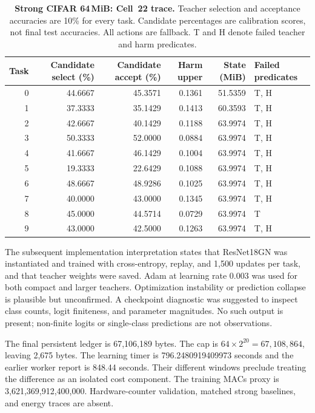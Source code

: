 \documentclass{article}
\begin{document}
\begin{table}[t]
\caption{\textbf{Strong CIFAR 64\,MiB: Cell~22 trace.} Teacher selection and acceptance accuracies are 10\% for every task. Candidate percentages are calibration scores, not final test accuracies. All actions are fallback. T and H denote failed teacher and harm predicates.}
\label{tab:strong-decisions}\centering\small
\begin{tabular}{rrrrrl}\toprule
Task & Candidate select (\%) & Candidate accept (\%) & Harm upper & State (MiB) & Failed predicates\\\midrule
0 & 44.6667 & 45.3571 & 0.1361 & 51.5359 & T, H\\
1 & 37.3333 & 35.1429 & 0.1413 & 60.3593 & T, H\\
2 & 42.6667 & 40.1429 & 0.1188 & 63.9974 & T, H\\
3 & 50.3333 & 52.0000 & 0.0884 & 63.9974 & T, H\\
4 & 41.6667 & 46.1429 & 0.1004 & 63.9974 & T, H\\
5 & 19.3333 & 22.6429 & 0.1088 & 63.9974 & T, H\\
6 & 48.6667 & 48.9286 & 0.1025 & 63.9974 & T, H\\
7 & 40.0000 & 43.0000 & 0.1345 & 63.9974 & T, H\\
8 & 45.0000 & 44.5714 & 0.0729 & 63.9974 & T\\
9 & 43.0000 & 42.5000 & 0.1263 & 63.9974 & T, H\\
\bottomrule\end{tabular}\end{table}

The subsequent implementation interpretation states that ResNet18GN was instantiated and trained with cross-entropy, replay, and 1,500 updates per task, and that teacher weights were saved. Adam at learning rate 0.003 was used for both compact and larger teachers. Optimization instability or prediction collapse is plausible but unconfirmed. A checkpoint diagnostic was suggested to inspect class counts, logit finiteness, and parameter magnitudes. No such output is present; non-finite logits or single-class predictions are not observations.

The final persistent ledger is 67,106,189 bytes. The cap is $64\times2^{20}=67,108,864$, leaving 2,675 bytes. The learning timer is 796.2480919409973 seconds and the earlier worker report is 848.44 seconds. Their different windows preclude treating the difference as an isolated cost component. The training MACs proxy is 3,621,369,912,400,000. Hardware-counter validation, matched strong baselines, and energy traces are absent.
\end{document}
